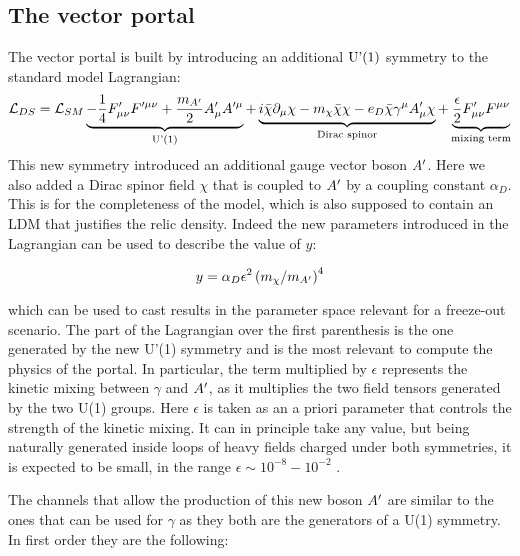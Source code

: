 \subsection{The vector portal}
\label{ch1:sec:dm-colliders}

The vector portal is built by introducing an additional $\textrm{U'(1)}$ symmetry to the standard model Lagrangian:
\begin{equation}
  \label{eq:dm-lagrangian}
  \mathcal{L}_{DS} = \mathcal{L}_{SM} \underbrace{- \frac{1}{4}F'_{\mu \nu}F'^{\mu \nu} + \frac{m_{A'}}{2}A'_{\mu}A'^{\mu}}_{\textrm{U'(1)}} + \underbrace{i \bar{\chi} \partial_{\mu} \chi - m_{\chi}\bar{\chi}\chi - e_D \bar{\chi}\gamma^{\mu}A'_{\mu}\chi}_{\textrm{Dirac spinor}} + \underbrace{\frac{\epsilon}{2}F'_{\mu \nu} F^{\mu \nu}}_{\textrm{mixing term}}
\end{equation}
This new symmetry introduced an additional gauge vector boson $A'$. Here we also added a Dirac spinor field $\chi$ that is coupled to $A'$ by a coupling constant $\alpha_D$. This is for the completeness of the model, which is also supposed to contain an LDM that justifies the relic density. Indeed the new parameters introduced in the Lagrangian can be used to describe the value of $y$:

    \begin{equation}
      \label{eq:dmplane-y-dp}
      y = \alpha_D \epsilon^2 \left(m_{\chi}/ m_{A'} \right)^4 
    \end{equation}

which can be used to cast results in the parameter space relevant for a freeze-out scenario.
The part of the Lagrangian over the first parenthesis is the one generated by the new U'(1) symmetry and is the most relevant to compute the physics of the portal. In particular, the term multiplied by $\epsilon$ represents the kinetic mixing between $\gamma$ and $A'$, as it multiplies the two field tensors generated by the two U(1) groups. Here $\epsilon$ is taken as an a priori parameter that controls the strength of the kinetic mixing. It can in principle take any value, but being naturally generated inside loops of heavy fields charged under both symmetries, it is expected to be small, in the range $\epsilon \sim 10^{-8} - 10^{-2}$ \cite{jdb}. 

The channels that allow the production of this new boson $A'$ are similar to the ones that can be used for $\gamma$ as they both are the generators of a U(1) symmetry. In first order they are the following:

